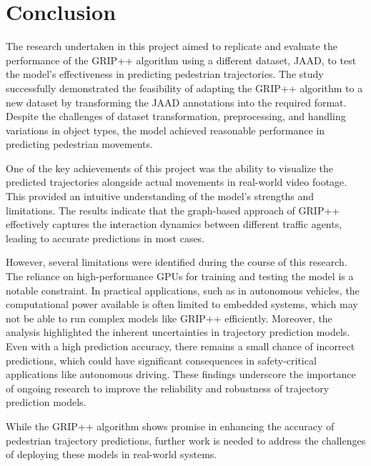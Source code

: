 \section{Conclusion}

\tab The research undertaken in this project aimed to replicate and evaluate the performance of the GRIP++ algorithm using a different dataset, JAAD, to test the model's effectiveness in predicting pedestrian trajectories. The study successfully demonstrated the feasibility of adapting the GRIP++ algorithm to a new dataset by transforming the JAAD annotations into the required format. Despite the challenges of dataset transformation, preprocessing, and handling variations in object types, the model achieved reasonable performance in predicting pedestrian movements.

\tab One of the key achievements of this project was the ability to visualize the predicted trajectories alongside actual movements in real-world video footage. This provided an intuitive understanding of the model's strengths and limitations. The results indicate that the graph-based approach of GRIP++ effectively captures the interaction dynamics between different traffic agents, leading to accurate predictions in most cases.

\tab However, several limitations were identified during the course of this research. The reliance on high-performance GPUs for training and testing the model is a notable constraint. In practical applications, such as in autonomous vehicles, the computational power available is often limited to embedded systems, which may not be able to run complex models like GRIP++ efficiently. Moreover, the analysis highlighted the inherent uncertainties in trajectory prediction models. Even with a high prediction accuracy, there remains a small chance of incorrect predictions, which could have significant consequences in safety-critical applications like autonomous driving. These findings underscore the importance of ongoing research to improve the reliability and robustness of trajectory prediction models.

\tab While the GRIP++ algorithm shows promise in enhancing the accuracy of pedestrian trajectory predictions, further work is needed to address the challenges of deploying these models in real-world systems. 